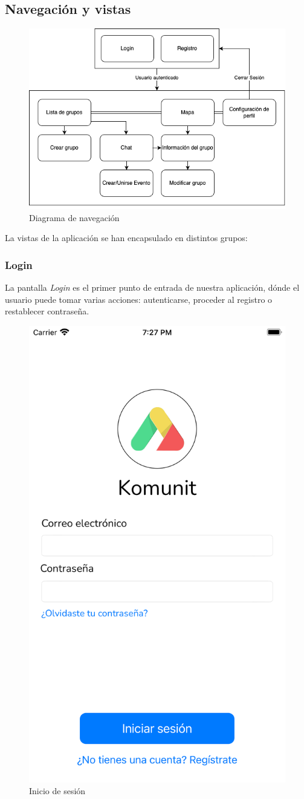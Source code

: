 \subsection{Navegación y vistas}
\begin{figure}[H]
        \centering
        \includegraphics[width=1\linewidth]{images/diagramaNavegacion (1).png}
        \caption{Diagrama de navegación}
        \label{fig:diagramaER}
\end{figure}
La vistas de la aplicación se han encapsulado en distintos grupos:

\subsubsection{Login}
La pantalla \textit{Login} es el primer punto de entrada de nuestra aplicación, dónde el usuario puede tomar varias acciones: autenticarse, proceder al registro o restablecer contraseña.

\begin{figure}[H]
        \centering
        \includegraphics[cframe=black 2pt,width=0.3\linewidth]{images/manual/login.png}
        \caption{Inicio de sesión}
        \label{fig:Vista Login}
\end{figure}

